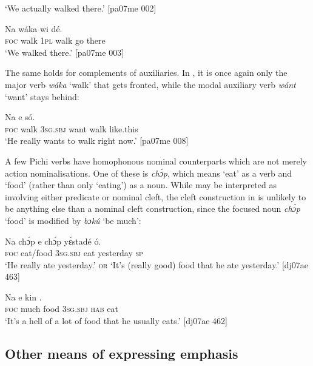 \glt ‘We actually walked there.’ [pa07me 002]
\z


\ea%
    \label{ex:key:738}
    \gll Na  wáka  wi      dé.\\
\textsc{foc}  walk  \textsc{1pl}  walk  go  there\\

\glt ‘We walked there.’ [pa07me 003]
\z

The same holds for complements of auxiliaries. In , it is once again only the major verb \textit{wáka} ‘walk’ that gets fronted, while the modal auxiliary verb \textit{wánt} ‘want’ stays behind: 


\ea%
    \label{ex:key:739}
    \gll Na    e        só.\\
\textsc{foc}  walk  \textsc{3sg.sbj}  want  walk  like.this\\

\glt ‘He really wants to walk right now.’ [pa07me 008]
\z

A few Pichi verbs have homophonous nominal counterparts which are not merely action nominalisations. One of these is \textit{chɔ́p}, which means ‘eat’ as a verb and ‘food’ (rather than only ‘eating’) as a noun. While  may be interpreted as involving either predicate or nominal cleft, the cleft construction in  is unlikely to be anything else than a nominal cleft construction, since the focused noun \textit{chɔ́p} ‘food’ is modified by \textit{bɔkú} ‘be much’:


\ea%
    \label{ex:key:740}
    \gll Na  chɔ́p    e    chɔ́p  yɛ́stadé    ó.\\
\textsc{foc}  eat/food    \textsc{3sg.sbj}  eat    yesterday  \textsc{sp}\\

\glt ‘He really ate yesterday.’ \textsc{or} ‘It’s (really good) food that he ate yesterday.’ [dj07ae 463]
\z


\ea%
    \label{ex:key:741}
    \gll Na      e    kin  .\\
\textsc{foc}  much  food    \textsc{3sg.sbj}  \textsc{hab}  eat\\

\glt ‘It’s a hell of a lot of food that he usually eats.’ [dj07ae 462]
\z

\subsection{Other means of expressing emphasis}

